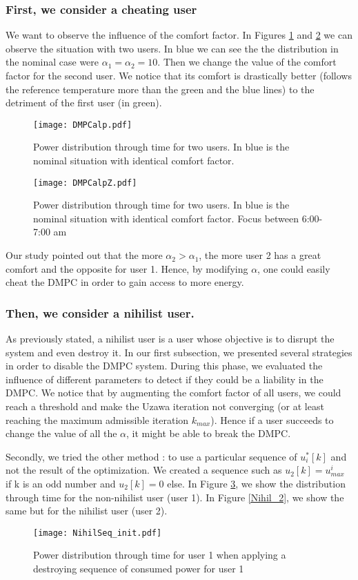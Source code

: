 \documentclass[conference, peerreview]{IEEEtran}
\edef\hc{\string:}
\begin{document}
\subsubsection{First, we consider a cheating user}
We want to observe the influence of the comfort factor. In Figures \ref{DMPCa_1} and \ref{DMPCa_2} we can observe the situation with two users. In blue we can see the the distribution in the nominal case were $\alpha_1=\alpha_2 = 10$. Then we change the value of the comfort factor for the second user. We notice that its comfort is drastically better (follows the reference temperature more than the green and the blue lines) to the detriment of the first user (in green).  

\begin{figure}[H]
\centering
\texttt{[image: DMPCalp.pdf]}
\caption{Power distribution through time for two users. In blue is the nominal situation with identical comfort factor.}
\label{DMPCa_1}
\end{figure}

\begin{figure}[H]
\centering
\texttt{[image: DMPCalpZ.pdf]}
\caption{Power distribution through time for two users. In blue is the nominal situation with identical comfort factor. Focus between 6\hc 00-7\hc 00 am}
\label{DMPCa_2}
\end{figure}

Our study pointed out that the more $\alpha_2 > \alpha_1$, the more user 2 has a great comfort and the opposite for user 1. Hence, by modifying $\alpha$, one could easily cheat the DMPC in order to gain access to more energy.


\subsubsection{Then, we consider a nihilist user.}
As previously stated, a nihilist user is a user whose objective is to disrupt the system and even destroy it. In our first subsection, we presented several strategies in order to disable the DMPC system.  During this phase, we evaluated the influence of different parameters to detect if they could be a liability in the DMPC. We notice that by augmenting the comfort factor of all users, we could reach a threshold and make the Uzawa iteration not converging (or at least reaching the maximum admissible iteration $k_{max}$). Hence if a user succeeds to change the value of all the $\alpha$, it might be able to break the DMPC. 

Secondly, we tried the other method : to use a particular sequence of $u^*_i[k]$ and not the result of the optimization. We created a sequence such as $u_2[k] = u^i_{max}$ if k is an odd number and  $u_2[k]=0$ else.  In Figure \ref{Nihil_1}, we show the distribution through time for the non-nihilist user (user 1). In Figure \ref{Nihil_2}, we show the same but for the nihilist user (user 2).
\begin{figure}[H]
\centering
\texttt{[image: NihilSeq\_init.pdf]}
\caption{Power distribution through time for user 1 when applying a destroying sequence of consumed power for user 1}
\label{Nihil_1}
\end{figure}
\end{document}
